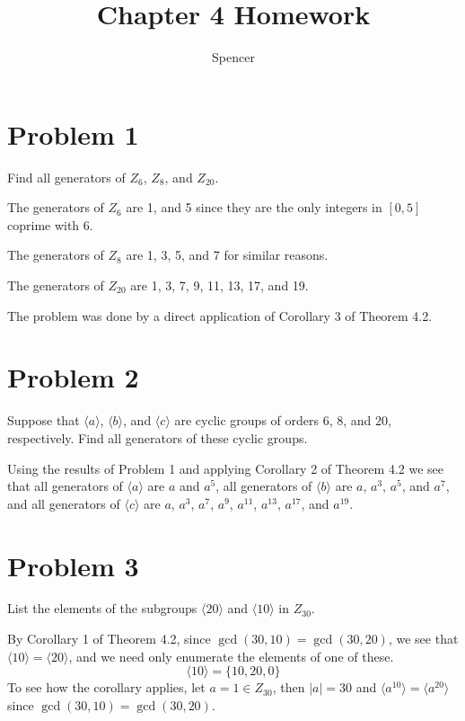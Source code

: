 \documentclass{article}
\title{Chapter 4 Homework}
\author{Spencer}
\begin{document}
\maketitle

\section*{Problem 1}

Find all generators of $Z_6$, $Z_8$, and $Z_{20}$.

The generators of $Z_6$ are 1, and 5 since they are the
only integers in $[0,5]$ coprime with 6.

The generators of $Z_8$ are 1, 3, 5, and 7 for similar reasons.

The generators of $Z_{20}$ are 1, 3, 7, 9, 11, 13, 17, and 19.

The problem was done by a direct application of Corollary 3 of
Theorem 4.2.

\section*{Problem 2}

Suppose that $\langle a\rangle$, $\langle b\rangle$, and $\langle c\rangle$
are cyclic groups of orders 6, 8, and 20, respectively.  Find all generators
of these cyclic groups.

Using the results of Problem 1 and applying Corollary 2 of Theorem
4.2 we see that all generators of $\langle a\rangle$ are $a$ and $a^5$,
all generators of $\langle b\rangle$ are $a$, $a^3$, $a^5$, and $a^7$,
and all generators of $\langle c\rangle$ are $a$, $a^3$, $a^7$, $a^9$,
$a^{11}$, $a^{13}$, $a^{17}$, and $a^{19}$.

\section*{Problem 3}

List the elements of the subgroups $\langle 20\rangle$ and
$\langle 10\rangle$ in $Z_{30}$.

By Corollary 1 of Theorem 4.2, since $\gcd(30,10)=\gcd(30,20)$,
we see that $\langle 10\rangle=\langle 20\rangle$, and we
need only enumerate the elements of one of these.
\begin{equation*}
\langle 10\rangle = \{ 10, 20, 0 \}
\end{equation*}
To see how the corollary applies, let $a=1\in Z_{30}$, then $|a|=30$ and
$\langle a^{10}\rangle=\langle a^{20}\rangle$ since $\gcd(30,10)=\gcd(30,20)$.
\end{document}
